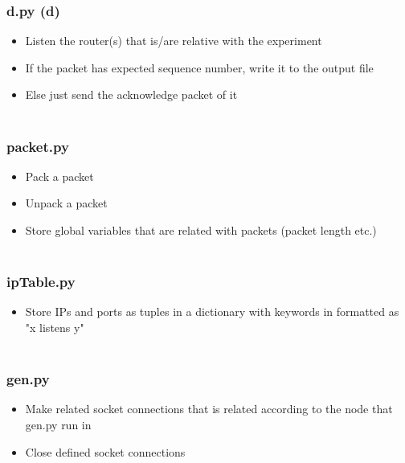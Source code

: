 \documentclass[conference]{IEEEtran}
\begin{document}
\subsubsection{\textbf{d.py (d)}}
\begin{itemize}
    \item Listen the router(s) that is/are relative with the experiment \\
    
    \item If the packet has expected sequence number, write it to the output file \\
    
    \item Else just send the acknowledge packet of it\\ \\
\end{itemize}

\subsubsection{\textbf{packet.py}}
\begin{itemize}
    \item Pack a packet\\
    
    \item Unpack a packet\\
    
    \item Store global variables that are related with packets (packet length etc.)\\ \\
\end{itemize}

\subsubsection{\textbf{ipTable.py}}
\begin{itemize}
    \item Store IPs and ports as tuples in a dictionary with keywords in formatted as "x listens y" \\ \\
    
\end{itemize}

\subsubsection{\textbf{gen.py}}
\begin{itemize}
    \item Make related socket connections that is related according to the node that gen.py run in \\
    
    \item Close defined socket connections \\ \\
\end{itemize}
\end{document}
